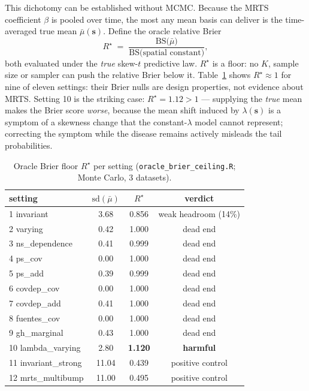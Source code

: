 \documentclass[11pt]{article}
\newcommand{\bs}{\boldsymbol{s}}
\begin{document}
This dichotomy can be established without MCMC. Because the MRTS coefficient
$\beta$ is pooled over time, the most any mean basis can deliver is the
time-averaged true mean $\bar\mu(\bs)$. Define the oracle relative Brier
\begin{equation}
R^\star \;=\; \frac{\mathrm{BS}\big(\bar\mu\big)}{\mathrm{BS}\big(\text{spatial
constant}\big)},
\end{equation}
both evaluated under the \emph{true} skew-$t$ predictive law. $R^\star$ is a
floor: no $K$, sample size or sampler can push the relative Brier below it.
Table~\ref{tab:oracle} shows $R^\star \approx 1$ for nine of eleven settings:
their Brier nulls are design properties, not evidence about MRTS. Setting 10 is
the striking case: $R^\star = 1.12 > 1$ --- supplying the \emph{true} mean makes
the Brier score \emph{worse}, because the mean shift induced by
$\lambda(\bs)$ is a symptom of a skewness change that the constant-$\lambda$
model cannot represent; correcting the symptom while the disease remains
actively misleads the tail probabilities.

\begin{table}[ht]
\centering\small
\caption{Oracle Brier floor $R^\star$ per setting
(\texttt{oracle\_brier\_ceiling.R}; Monte Carlo, 3 datasets).}
\label{tab:oracle}
\begin{tabular}{lccc}
\toprule
setting & $\mathrm{sd}(\bar\mu)$ & $R^\star$ & verdict \\
\midrule
1 invariant          & 3.68  & 0.856 & weak headroom (14\%) \\
2 varying            & 0.42  & 1.000 & dead end \\
3 ns\_dependence     & 0.41  & 0.999 & dead end \\
4 ps\_cov            & 0.00  & 1.000 & dead end \\
5 ps\_add            & 0.39  & 0.999 & dead end \\
6 covdep\_cov        & 0.00  & 1.000 & dead end \\
7 covdep\_add        & 0.41  & 1.000 & dead end \\
8 fuentes\_cov       & 0.00  & 1.000 & dead end \\
9 gh\_marginal       & 0.43  & 1.000 & dead end \\
10 lambda\_varying   & 2.80  & \textbf{1.120} & \textbf{harmful} \\
11 invariant\_strong & 11.04 & 0.439 & positive control \\
12 mrts\_multibump   & 11.00 & 0.495 & positive control \\
\bottomrule
\end{tabular}
\end{table}
\end{document}
